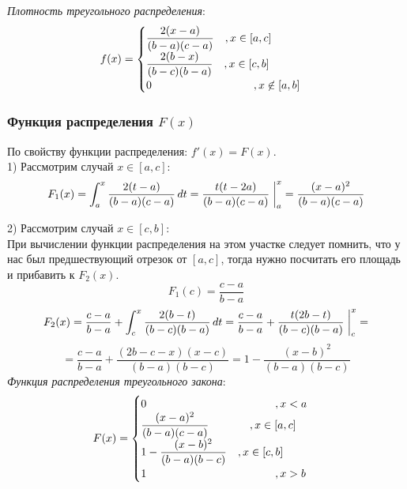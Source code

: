 \documentclass[14pt,fleqn]{extarticle}
\def\at{
	\left.
	\vphantom{\int}
	\right|
}
\begin{document}
    \newpage
    
    \textit{Плотность треугольного распределения}:
    \begin{align*}
        f(x) =
        \begin{cases}
            \dfrac{2(x-a)}{(b-a)(c-a)} \quad , x \in [a,c]\\
            \dfrac{2(b-x)}{(b-c)(b-a)} \quad , x \in [c,b]\\
            0 \hspace{3.25cm} , x \centernot\in [a,b]\\
        \end{cases}
    \end{align*}
    
    \subsubsection*{Функция распределения $F(x)$}

    По свойству функции распределения: $f'(x) = F(x)$.\\

    1) Рассмотрим случай $x \in [a,c]:$
    \[ F_1(x) = \int_{a}^{x} \dfrac{2(t-a)}{(b-a)(c-a)} \,dt = \dfrac{t(t-2a)}{(b-a)(c-a)}\at_{a}^{x} = \dfrac{(x-a)^2}{(b-a)(c-a)} \]
    
    2) Рассмотрим случай $x \in [c,b]$:\\
    \newline
    При вычислении функции распределения на этом участке следует помнить, что у нас был предшествующий отрезок от $[a,c]$, тогда нужно посчитать его площадь и прибавить к $F_2(x)$.
    \[ F_1(c) = \dfrac{c-a}{b-a}\]
    \[ F_2(x) = \dfrac{c-a}{b-a} + \int_{c}^{x} \dfrac{2(b-t)}{(b-c)(b-a)} \,dt = \dfrac{c-a}{b-a} + \dfrac{t(2b-t)}{(b-c)(b-a)}\at_{c}^{x} = \]
    \[ = \dfrac{c-a}{b-a} + \dfrac{(2b-c-x)(x-c)}{(b-a)(b-c)} = 1 - \dfrac{(x-b)^2}{(b-a)(b-c)} \]
    \newline
    \textit{Функция распределения треугольного закона}:
    \begin{align*}
        F(x) =
        \begin{cases}
            0 \hspace{4.1cm} , x < a\\
            \dfrac{(x-a)^2}{(b-a)(c-a)} \hspace{1.3cm} , x \in [a,c]\\
            1 - \dfrac{(x-b)^2}{(b-a)(b-c)} \quad , x \in [c,b]\\
            1 \hspace{4.1cm} , x > b\\
        \end{cases}
    \end{align*}
   
\end{document}

